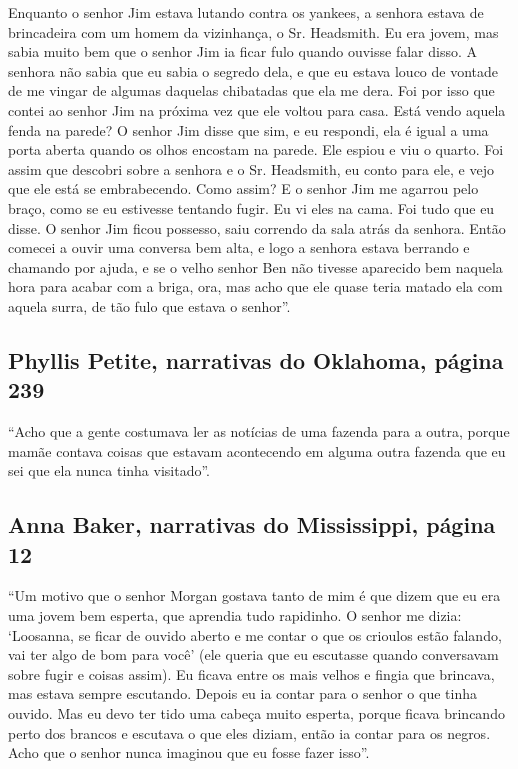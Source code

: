 Enquanto o senhor Jim estava lutando contra os yankees, a senhora estava
de brincadeira com um homem da vizinhança, o Sr. Headsmith. Eu era
jovem, mas sabia muito bem que o senhor Jim ia ficar fulo quando ouvisse
falar disso. A senhora não sabia que eu sabia o segredo dela, e que eu
estava louco de vontade de me vingar de algumas daquelas chibatadas que
ela me dera. Foi por isso que contei ao senhor Jim na próxima vez que
ele voltou para casa. Está vendo aquela fenda na parede? O senhor Jim
disse que sim, e eu respondi, ela é igual a uma porta aberta quando os
olhos encostam na parede. Ele espiou e viu o quarto. Foi assim que
descobri sobre a senhora e o Sr. Headsmith, eu conto para ele, e vejo
que ele está se embrabecendo. Como assim? E o senhor Jim me agarrou pelo
braço, como se eu estivesse tentando fugir. Eu vi eles na cama. Foi tudo
que eu disse. O senhor Jim ficou possesso, saiu correndo da sala atrás
da senhora. Então comecei a ouvir uma conversa bem alta, e logo a
senhora estava berrando e chamando por ajuda, e se o velho senhor Ben
não tivesse aparecido bem naquela hora para acabar com a briga, ora, mas
acho que ele quase teria matado ela com aquela surra, de tão fulo que
estava o senhor''.

\subsection{Phyllis Petite, narrativas do Oklahoma, página 239}
\label{ref211}

``Acho que a gente costumava ler as notícias de uma fazenda para a
outra, porque mamãe contava coisas que estavam acontecendo em alguma
outra fazenda que eu sei que ela nunca tinha visitado''.

\subsection{Anna Baker, narrativas do Mississippi, página 12} \label{ref13}

``Um motivo que o senhor Morgan gostava tanto de mim é que dizem que eu
era uma jovem bem esperta, que aprendia tudo rapidinho. O senhor me
dizia: `Loosanna, se ficar de ouvido aberto e me contar o que os
crioulos estão falando, vai ter algo de bom para você' (ele queria que
eu escutasse quando conversavam sobre fugir e coisas assim). Eu ficava
entre os mais velhos e fingia que brincava, mas estava sempre escutando.
Depois eu ia contar para o senhor o que tinha ouvido. Mas eu devo ter
tido uma cabeça muito esperta, porque ficava brincando perto dos brancos
e escutava o que eles diziam, então ia contar para os negros. Acho que o
senhor nunca imaginou que eu fosse fazer isso''.

